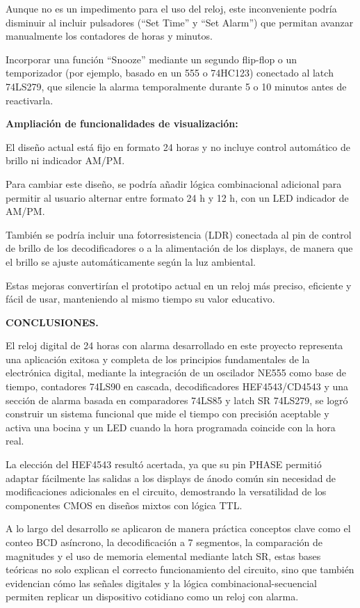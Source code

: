 \documentclass[12pt,letterpaper]{article}
\begin{document}
\indent Aunque no es un impedimento para el uso del reloj, este inconveniente podría disminuir al incluir pulsadores (“Set Time” y “Set Alarm”) que permitan avanzar manualmente los contadores de horas y minutos.  

\indent Incorporar una función “Snooze” mediante un segundo flip-flop o un temporizador (por ejemplo, basado en un 555 o 74HC123) conectado al latch 74LS279, que silencie la alarma temporalmente durante 5 o 10 minutos antes de reactivarla.

\textbf{Ampliación de funcionalidades de visualización:}

\indent El diseño actual está fijo en formato 24 horas y no incluye control automático de brillo ni indicador AM/PM.

\indent Para cambiar este diseño, se podría añadir lógica combinacional adicional para permitir al usuario alternar entre formato 24 h y 12 h, con un LED indicador de AM/PM.  

\indent También se podría incluir una fotorresistencia (LDR) conectada al pin de control de brillo de los decodificadores o a la alimentación de los displays, de manera que el brillo se ajuste automáticamente según la luz ambiental.

\indent Estas mejoras convertirían el prototipo actual en un reloj más preciso, eficiente y fácil de usar, manteniendo al mismo tiempo su valor educativo.

\pagebreak

\textbf{CONCLUSIONES.}

\indent El reloj digital de 24 horas con alarma desarrollado en este proyecto representa una aplicación exitosa y completa de los principios fundamentales de la electrónica digital, mediante la integración de un oscilador NE555 como base de tiempo, contadores 74LS90 en cascada, decodificadores HEF4543/CD4543 y una sección de alarma basada en comparadores 74LS85 y latch SR 74LS279, se logró construir un sistema funcional que mide el tiempo con precisión aceptable y activa una bocina y un LED cuando la hora programada coincide con la hora real. 

\indent La elección del HEF4543 resultó acertada, ya que su pin PHASE permitió adaptar fácilmente las salidas a los displays de ánodo común sin necesidad de modificaciones adicionales en el circuito, demostrando la versatilidad de los componentes CMOS en diseños mixtos con lógica TTL.

\indent A lo largo del desarrollo se aplicaron de manera práctica conceptos clave como el conteo BCD asíncrono, la decodificación a 7 segmentos, la comparación de magnitudes y el uso de memoria elemental mediante latch SR, estas bases teóricas no solo explican el correcto funcionamiento del circuito, sino que también evidencian cómo las señales digitales y la lógica combinacional-secuencial permiten replicar un dispositivo cotidiano como un reloj con alarma.
\end{document}
